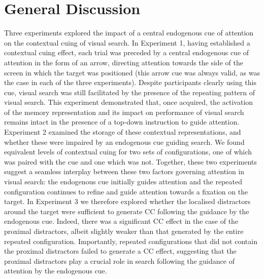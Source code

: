 \documentclass[
  man,
  floatsintext,
  longtable,
  nolmodern,
  notxfonts,
  notimes,
  colorlinks=true,linkcolor=blue,citecolor=blue,urlcolor=blue]{apa7}
\begin{document}
\section{General Discussion}\label{general-discussion}

Three experiments explored the impact of a central endogenous cue of
attention on the contextual cuing of visual search. In Experiment 1,
having established a contextual cuing effect, each trial was preceded by
a central endogenous cue of attention in the form of an arrow, directing
attention towards the side of the screen in which the target was
positioned (this arrow cue was always valid, as was the case in each of
the three experiments). Despite participants clearly using this cue,
visual search was still facilitated by the presence of the repeating
pattern of visual search. This experiment demonstrated that, once
acquired, the activation of the memory representation and its impact on
performance of visual search remains intact in the presence of a
top-down instruction to guide attention. Experiment 2 examined the
storage of these contextual representations, and whether these were
impaired by an endogenous cue guiding search. We found equivalent levels
of contextual cuing for two sets of configurations, one of which was
paired with the cue and one which was not. Together, these two
experiments suggest a seamless interplay between these two factors
governing attention in visual search: the endogenous cue initially
guides attention and the repeated configuration continues to refine and
guide attention towards a fixation on the target. In Experiment 3 we
therefore explored whether the localised distractors around the target
were sufficient to generate CC following the guidance by the endogenous
cue. Indeed, there was a significant CC effect in the case of the
proximal distractors, albeit slightly weaker than that generated by the
entire repeated configuration. Importantly, repeated configurations that
did not contain the proximal distractors failed to generate a CC effect,
suggesting that the proximal distractors play a crucial role in search
following the guidance of attention by the endogenous cue.
\end{document}
